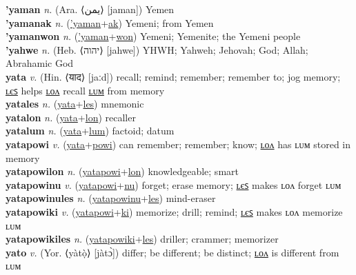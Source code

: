 \textbf{'yaman} \textit{n.} (Ara. ⟨يمن⟩ [jaman])
Yemen \label{'yaman} \\
\textbf{'yamanak} \textit{n.} (\hyperref['yaman]{'yaman}+\hyperref[ak]{ak})
Yemeni; from Yemen \label{'yamanak} \\
\textbf{'yamanwon} \textit{n.} (\hyperref['yaman]{'yaman}+\hyperref[won]{won})
Yemeni; Yemenite; the Yemeni people \label{'yamanwon} \\
\textbf{'yahwe} \textit{n.} (Heb. ⟨יהוה‬⟩ [jahwe])
YHWH; Yahweh; Jehovah; God; Allah; Abrahamic God \label{'yahwe} \\
\textbf{yata} \textit{v.} (Hin. ⟨याद⟩ [jaːd])
recall; remind; remember; remember to; jog memory; \hyperref[yatales]{ʟєꜱ} helps \hyperref[yatalon]{ʟᴏᴧ} recall \hyperref[yatalum]{ʟᴜᴍ} from memory \label{yata} \\
\textbf{yatales} \textit{n.} (\hyperref[yata]{yata}+\hyperref[les]{les})
mnemonic \label{yatales} \\
\textbf{yatalon} \textit{n.} (\hyperref[yata]{yata}+\hyperref[lon]{lon})
recaller \label{yatalon} \\
\textbf{yatalum} \textit{n.} (\hyperref[yata]{yata}+\hyperref[lum]{lum})
factoid; datum \label{yatalum} \\
\textbf{yatapowi} \textit{v.} (\hyperref[yata]{yata}+\hyperref[powi]{powi})
can remember; remember; know; \hyperref[yatapowilon]{ʟᴏᴧ} has ʟᴜᴍ stored in memory \label{yatapowi} \\
\textbf{yatapowilon} \textit{n.} (\hyperref[yatapowi]{yatapowi}+\hyperref[lon]{lon})
knowledgeable; smart \label{yatapowilon} \\
\textbf{yatapowinu} \textit{v.} (\hyperref[yatapowi]{yatapowi}+\hyperref[nu]{nu})
forget; erase memory; \hyperref[yatapowinules]{ʟєꜱ} makes ʟᴏᴧ forget ʟᴜᴍ \label{yatapowinu} \\
\textbf{yatapowinules} \textit{n.} (\hyperref[yatapowinu]{yatapowinu}+\hyperref[les]{les})
mind-eraser \label{yatapowinules} \\
\textbf{yatapowiki} \textit{v.} (\hyperref[yatapowi]{yatapowi}+\hyperref[ki]{ki})
memorize; drill; remind; \hyperref[yatapowikiles]{ʟєꜱ} makes ʟᴏᴧ memorize ʟᴜᴍ \label{yatapowiki} \\
\textbf{yatapowikiles} \textit{n.} (\hyperref[yatapowiki]{yatapowiki}+\hyperref[les]{les})
driller; crammer; memorizer \label{yatapowikiles} \\
\textbf{yato} \textit{v.} (Yor. ⟨yàtọ̀⟩ [jàtɔ̀])
differ; be different; be distinct; \hyperref[yatolon]{ʟᴏᴧ} is different from ʟᴜᴍ \label{yato} \\
